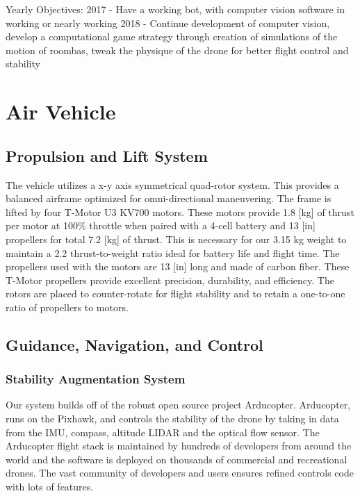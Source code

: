 \documentclass[12pt,letterpaper]{article}
\begin{document}
	Yearly Objectives:
	2017 - Have a working bot, with computer vision software in working or nearly working
	2018 - Continue development of computer vision, develop a computational  game strategy through creation of simulations of the motion of roombas, tweak the physique of the drone for better flight control and stability



\section*{Air Vehicle}
	\subsection*{Propulsion and Lift System}
	        The vehicle utilizes a x-y axis symmetrical quad-rotor system. This provides a balanced airframe optimized for omni-directional maneuvering. The frame is lifted by four T-Motor U3 KV700 motors. These motors provide 1.8 [kg] of thrust per motor at 100\% throttle when paired with a 4-cell battery and 13 [in] propellers for total 7.2 [kg] of thrust. This is necessary for our 3.15 kg weight to maintain a 2.2 thrust-to-weight ratio ideal for battery life and flight time. 
			The propellers used with the motors are 13 [in] long and made of carbon fiber. These T-Motor propellers provide excellent precision, durability, and efficiency. The rotors are placed to counter-rotate for flight stability and to retain a one-to-one ratio of propellers to motors.



	\subsection*{Guidance, Navigation, and Control}
		\subsubsection*{Stability Augmentation System}
			Our system builds off of the robust open source project Arducopter.  Arducopter, runs on the Pixhawk, and controls the stability of the drone by taking in data from the IMU, compass, altitude LIDAR and the optical flow sensor. The Arducopter flight stack is maintained by hundreds of developers from around the world and the software is deployed on thousands of commercial and recreational drones.  The vast community of developers and users ensures refined controls code with lots of features. 
\end{document}
